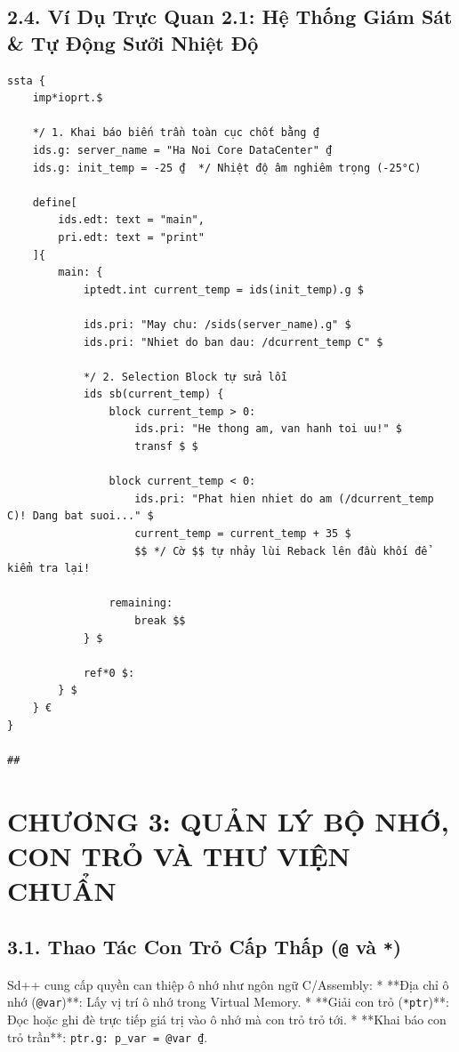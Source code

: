 \documentclass[11pt, a4paper]{article}
\begin{document}
\subsection{2.4. Ví Dụ Trực Quan 2.1: Hệ Thống Giám Sát \& Tự Động Sưởi Nhiệt Độ}
\begin{lstlisting}[caption={Chương trình tự sửa lỗi nhiệt độ với cờ Reback \$\$}]
ssta {
    imp*ioprt.$

    */ 1. Khai báo biến trần toàn cục chốt bằng ₫
    ids.g: server_name = "Ha Noi Core DataCenter" ₫
    ids.g: init_temp = -25 ₫  */ Nhiệt độ âm nghiêm trọng (-25°C)

    define[
        ids.edt: text = "main",
        pri.edt: text = "print"
    ]{
        main: {
            iptedt.int current_temp = ids(init_temp).g $

            ids.pri: "May chu: /sids(server_name).g" $
            ids.pri: "Nhiet do ban dau: /dcurrent_temp C" $

            */ 2. Selection Block tự sửa lỗi
            ids sb(current_temp) {
                block current_temp > 0:
                    ids.pri: "He thong am, van hanh toi uu!" $
                    transf $ $

                block current_temp < 0:
                    ids.pri: "Phat hien nhiet do am (/dcurrent_temp C)! Dang bat suoi..." $
                    current_temp = current_temp + 35 $
                    $$ */ Cờ $$ tự nhảy lùi Reback lên đầu khối để kiểm tra lại!

                remaining:
                    break $$
            } $

            ref*0 $:
        } $
    } €
}

##
\end{lstlisting}

\section{CHƯƠNG 3: QUẢN LÝ BỘ NHỚ, CON TRỎ VÀ THƯ VIỆN CHUẨN}

\subsection{3.1. Thao Tác Con Trỏ Cấp Thấp (\texttt{@} và \texttt{*})}
Sd++ cung cấp quyền can thiệp ô nhớ như ngôn ngữ C/Assembly:
* **Địa chỉ ô nhớ (\texttt{@var})**: Lấy vị trí ô nhớ trong Virtual Memory.
* **Giải con trỏ (\texttt{*ptr})**: Đọc hoặc ghi đè trực tiếp giá trị vào ô nhớ mà con trỏ trỏ tới.
* **Khai báo con trỏ trần**: \texttt{ptr.g: p\_var = @var ₫}.
\end{document}
